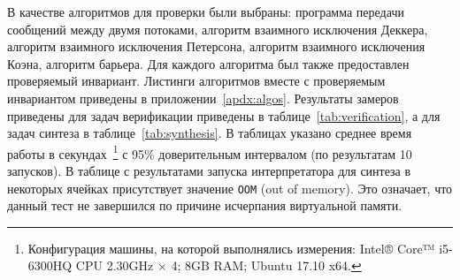 В качестве алгоритмов для проверки были выбраны:
программа передачи сообщений между двумя потоками,
алгоритм взаимного исключения Деккера, 
алгоритм взаимного исключения Петерсона, 
алгоритм взаимного исключения Коэна, 
алгоритм барьера.
Для каждого алгоритма был также предоставлен проверяемый инвариант.
Листинги алгоритмов вместе с проверяемым инвариантом 
приведены в приложении~\ref{apdx:algos}.
Результаты замеров приведены для задач верификации приведены в таблице~\ref{tab:verification},
а для задач синтеза в таблице~\ref{tab:synthesis}.
В таблицах указано среднее время работы в секундах~\footnote{
Конфигурация машины, на которой выполнялись измерения: 
Intel® Core™ i5-6300HQ CPU 2.30GHz × 4; 8GB RAM; Ubuntu 17.10 x64.
} 
с 95\% доверительным интервалом
(по результатам 10 запусков).
В таблице с результатами запуска интерпретатора для синтеза в некоторых 
ячейках присутствует значение \texttt{OOM} (out of memory).
Это означает, что данный тест не завершился по причине 
исчерпания виртуальной памяти.


